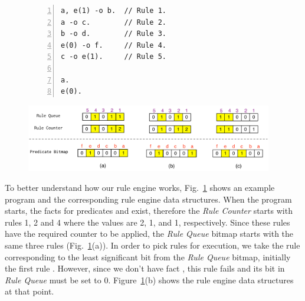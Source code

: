 \begin{figure}[t]
   \begin{center}
\begin{BVerbatim}[numbers=left,fontsize=\codesize]
a, e(1) -o b.  // Rule 1.
a -o c.        // Rule 2.
b -o d.        // Rule 3.
e(0) -o f.     // Rule 4.
c -o e(1).     // Rule 5.

a.
e(0).
\end{BVerbatim}
\end{center}
\vspace{5mm}
   \includegraphics[width=0.96\textwidth]{figures/implementation/rule_queue.pdf}


   \label{fig:implementation:rule_engine}
\end{figure}

To better understand how our rule engine works,
Fig.~\ref{fig:implementation:rule_engine} shows an example program and the
corresponding rule engine data structures. When the program starts, the facts
for predicates  and  exist, therefore the \emph{Rule Counter}
starts with rules 1, 2 and 4 where the values are 2, 1, and 1, respectively.
Since these rules have the required counter to be applied, the \emph{Rule Queue}
bitmap starts with the same three rules
(Fig.~\ref{fig:implementation:rule_engine}(a)).  In order to pick rules for
execution, we take the rule corresponding to the least significant bit from the
\emph{Rule Queue} bitmap, initially the first rule .
However, since we don't have fact , this rule fails and its bit in
\emph{Rule Queue} must be set to 0.
Figure~\ref{fig:implementation:rule_engine}(b) shows the rule engine data
structures at that point.

